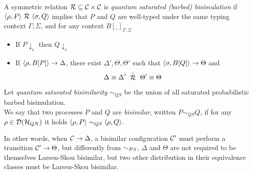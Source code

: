 \begin{definition}
	A symmetric relation $\mathcal{R} \subseteq \mathcal{C} \times \mathcal{C}$ is \emph{quantum saturated (barbed) bisimulation} if $\langle\rho, P\rangle \ \mathcal{R}\ \langle\sigma, Q\rangle$ implies that $P$ and $Q$  are well-typed under the same typing context $\Gamma; \Sigma$, and for any context $B[\_]_{\Gamma, \Sigma}$
	\begin{itemize}
		\item If $P \downarrow_{c}$ then $Q \downarrow_{c}$
		\item If $\langle\rho, B[P]\rangle \rightarrow \Delta$, there exist $\Delta', \Theta, \Theta'$ such that $\langle\sigma, B[Q]\rangle \rightarrow \Theta$ and \[\Delta \equiv \Delta' \ \slift{\rel}\ \Theta' \equiv \Theta\]
	\end{itemize}
	Let \emph{quantum saturated bisimilarity} $\sim_{QS}$ be the union of all saturated probabilistic barbed bisimulation. \\
	We say that two {processes} $P$ and $Q$ are \emph{bisimilar}, written $P \sim_{QS} Q$, if for any $\rho \in \mathcal{D}(\mathcal{H}_{QN})$ it holds $\langle\rho, P\rangle \sim_{QS} \langle\rho, Q\rangle$.
\end{definition}

In other words, when $\mathcal{C} \rightarrow \Delta$, a bisimilar configuration $\mathcal{C}'$ must perform a transition $\mathcal{C}' \rightarrow \Theta$, but differently from $\sim_{PS}$, $\Delta$ and $\Theta$ are not required to be themselves Larsen-Skou bisimilar, but two other distribution in their equivalence classes must be Larsen-Skou bisimilar.


